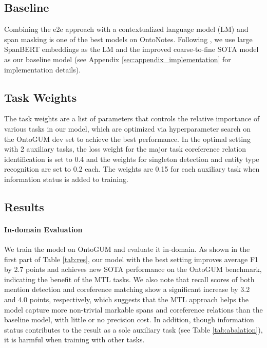 \documentclass[11pt]{article}
\begin{document}
\subsection{Baseline}
Combining the e2e approach with a contextualized language model (LM) and span masking is one of the best models on OntoNotes. Following \citet{joshi-etal-2020-spanbert}, we use large SpanBERT embeddings as the LM and the improved coarse-to-fine \citep{lee-etal-2018-higher} SOTA model as our baseline model (see Appendix \ref{sec:appendix_implementation} for implementation details).



\subsection{Task Weights}
The task weights are a list of parameters that controls the relative importance of various tasks in our model, which are optimized via hyperparameter search on the OntoGUM dev set to achieve the best performance. In the optimal setting with 2 auxiliary tasks, the loss weight for the major task coreference relation identification is set to 0.4 and the weights for singleton detection and entity type recognition 
are set to 0.2 each. The weights are 0.15 for each auxiliary task when information status is added to training.

\subsection{Results}
\paragraph{In-domain Evaluation}
We train the model on OntoGUM and evaluate it in-domain.
As shown in the first part of Table \ref{tab:res}, our model with the best setting improves average F1 by 2.7 points and achieves new SOTA performance on the OntoGUM benchmark, indicating the benefit of the MTL tasks. We also note that recall scores of both mention detection and coreference matching show a significant increase by 3.2 and 4.0 points, respectively,
which suggests that the MTL approach helps the model capture more non-trivial markable spans and coreference relations than the baseline model, with little or no precision cost. In addition, though information status contributes to the result as a sole auxiliary task (see Table \ref{tab:abalation}), it is harmful when training with other tasks.
\end{document}
